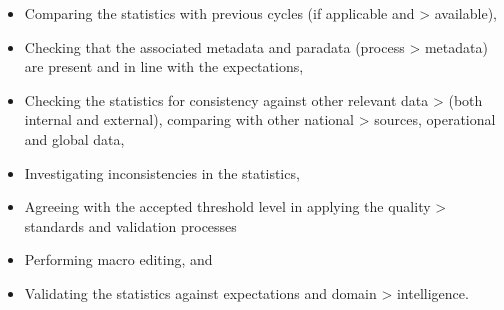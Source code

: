 \documentclass[
]{article}
\begin{document}
\begin{itemize}
\item
  Comparing the statistics with previous cycles (if applicable and
  \textgreater{} available),
\item
  Checking that the associated metadata and paradata (process
  \textgreater{} metadata) are present and in line with the expectations,
\item
  Checking the statistics for consistency against other relevant data
  \textgreater{} (both internal and external), comparing with other national
  \textgreater{} sources, operational and global data,
\item
  Investigating inconsistencies in the statistics,
\item
  Agreeing with the accepted threshold level in applying the quality
  \textgreater{} standards and validation processes
\item
  Performing macro editing, and
\item
  Validating the statistics against expectations and domain
  \textgreater{} intelligence.
\end{itemize}
\end{document}
